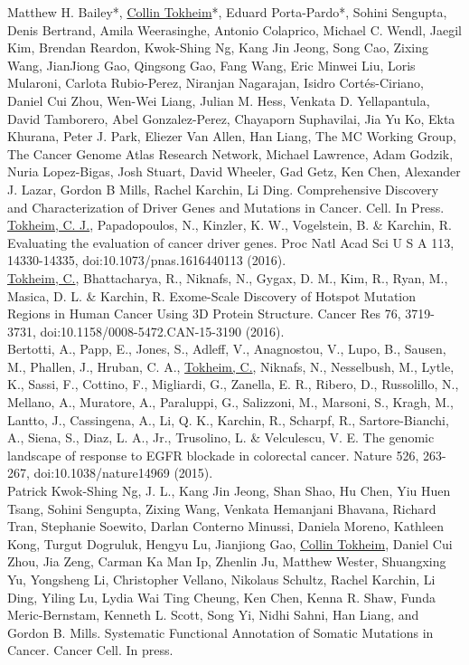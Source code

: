 \begin{vita}
Matthew H. Bailey*, \underline{Collin Tokheim}*, Eduard Porta-Pardo*, Sohini Sengupta, Denis Bertrand, Amila Weerasinghe, Antonio Colaprico, Michael C. Wendl, Jaegil Kim,  Brendan Reardon, Kwok-Shing Ng, Kang Jin Jeong, Song Cao, Zixing Wang, JianJiong Gao, Qingsong Gao, Fang Wang, Eric Minwei Liu, Loris Mularoni, Carlota Rubio-Perez, Niranjan Nagarajan, Isidro Cortés-Ciriano, Daniel Cui Zhou, Wen-Wei Liang, Julian M. Hess, Venkata D. Yellapantula, David Tamborero, Abel Gonzalez-Perez, Chayaporn Suphavilai, Jia Yu Ko, Ekta Khurana, Peter J. Park, Eliezer Van Allen, Han Liang, The MC Working Group, The Cancer Genome Atlas Research Network, Michael Lawrence, Adam Godzik, Nuria Lopez-Bigas, Josh Stuart, David Wheeler, Gad Getz, Ken Chen, Alexander J. Lazar, Gordon B Mills, Rachel Karchin, Li Ding. Comprehensive Discovery and Characterization of Driver Genes and Mutations in Cancer. Cell. In Press.\\

\underline{Tokheim, C. J.}, Papadopoulos, N., Kinzler, K. W., Vogelstein, B. \& Karchin, R. Evaluating the evaluation of cancer driver genes. Proc Natl Acad Sci U S A 113, 14330-14335, doi:10.1073/pnas.1616440113 (2016).\\

\underline{Tokheim, C.}, Bhattacharya, R., Niknafs, N., Gygax, D. M., Kim, R., Ryan, M., Masica, D. L. \& Karchin, R. Exome-Scale Discovery of Hotspot Mutation Regions in Human Cancer Using 3D Protein Structure. Cancer Res 76, 3719-3731, doi:10.1158/0008-5472.CAN-15-3190 (2016).\\

Bertotti, A., Papp, E., Jones, S., Adleff, V., Anagnostou, V., Lupo, B., Sausen, M., Phallen, J., Hruban, C. A., \underline{Tokheim, C.}, Niknafs, N., Nesselbush, M., Lytle, K., Sassi, F., Cottino, F., Migliardi, G., Zanella, E. R., Ribero, D., Russolillo, N., Mellano, A., Muratore, A., Paraluppi, G., Salizzoni, M., Marsoni, S., Kragh, M., Lantto, J., Cassingena, A., Li, Q. K., Karchin, R., Scharpf, R., Sartore-Bianchi, A., Siena, S., Diaz, L. A., Jr., Trusolino, L. \& Velculescu, V. E. The genomic landscape of response to EGFR blockade in colorectal cancer. Nature 526, 263-267, doi:10.1038/nature14969 (2015).\\

Patrick Kwok-Shing Ng, J. L., Kang Jin Jeong, Shan Shao, Hu Chen, Yiu Huen Tsang, Sohini Sengupta, Zixing Wang, Venkata Hemanjani Bhavana, Richard Tran, Stephanie Soewito, Darlan Conterno Minussi, Daniela Moreno, Kathleen Kong, Turgut Dogruluk, Hengyu Lu, Jianjiong Gao, \underline{Collin Tokheim}, Daniel Cui Zhou, Jia Zeng, Carman Ka Man Ip, Zhenlin Ju, Matthew Wester, Shuangxing Yu, Yongsheng Li, Christopher Vellano, Nikolaus Schultz, Rachel Karchin, Li Ding, Yiling Lu, Lydia Wai Ting Cheung, Ken Chen,  Kenna R. Shaw, Funda Meric-Bernstam, Kenneth L. Scott, Song Yi, Nidhi Sahni, Han Liang, and Gordon B. Mills. Systematic Functional Annotation of Somatic Mutations in Cancer. Cancer Cell. In press.\\


\end{vita}
